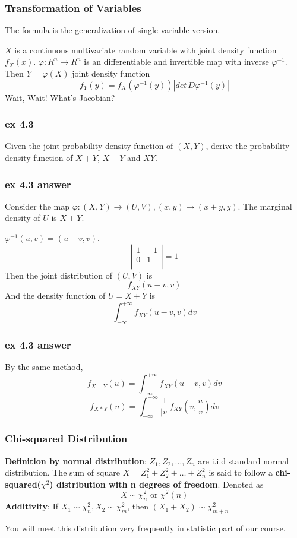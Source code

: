 \documentclass{beamer}
\begin{document}
\begin{frame}
    \frametitle{Transformation of Variables}
    The formula is the generalization of single variable version.\par
    $X$ is a continuous multivariate random variable with joint density function $f_{X}(x)$. $\varphi: R^n\rightarrow R^n$ is an differentiable and invertible map with inverse $\varphi^{-1}$. Then $Y=\varphi(X)$ joint density function
    \[f_{Y}(y)=f_X(\varphi^{-1}(y))|det\, D\varphi^{-1}(y)|\]
    Wait, Wait! What's Jacobian?

\end{frame}

\begin{frame}
    \frametitle{ex 4.3}
    Given the joint probability density function of $(X,Y)$, derive the probability density function of $X+Y$, $X-Y$ and $XY$.

\end{frame}

\begin{frame}
    \frametitle{ex 4.3 answer}
    Consider the map $\varphi: (X,Y)\rightarrow (U,V), (x,y)\mapsto (x+y,y)$. The marginal density of $U$ is $X+Y$.\par
    $\varphi^{-1}(u,v)=(u-v,v)$. 
    $$
    \left |\begin{array}{cccc}
    1 &-1    \\
    0 & 1 \\
    \end{array}\right|=1
    $$
    Then the joint distribution of $(U,V)$ is
    \[f_{XY}(u-v,v)\]
    And the density function of $U=X+Y$ is 
    \[\int_{-\infty}^{+\infty}f_{XY}(u-v,v)dv\]
    

\end{frame}
\begin{frame}
    \frametitle{ex 4.3 answer}
    By the same method, 
    \[f_{X-Y}(u)=\int_{-\infty}^{+\infty}f_{XY}(u+v,v)dv\]
    \[f_{X*Y}(u)=\int_{-\infty}^{+\infty}\frac{1}{|v|}f_{XY}(v,\frac{u}{v})dv\]
    
\end{frame}

\begin{frame}
    \frametitle{Chi-squared Distribution}
    \textbf{Definition by normal distribution}: $Z_1, Z_2, \dots, Z_n$ are i.i.d standard normal distribution. The sum of square $X=Z_1^2+Z_2^2+\dots + Z_n^2$ is said to follow a \textbf{chi-squared($\chi^2$) distribution with n degrees of freedom}. Denoted as
    \[X\sim \chi^2_{n} \text{ or } \chi^2(n)\]
    \textbf{Additivity}: If $X_1\sim \chi^2_{n}, X_2\sim \chi^2_{m}$, then $(X_1+X_2)\sim \chi^2_{m+n}$\par
    You will meet this distribution very frequently in statistic part of our course.
    

\end{frame}
\end{document}
